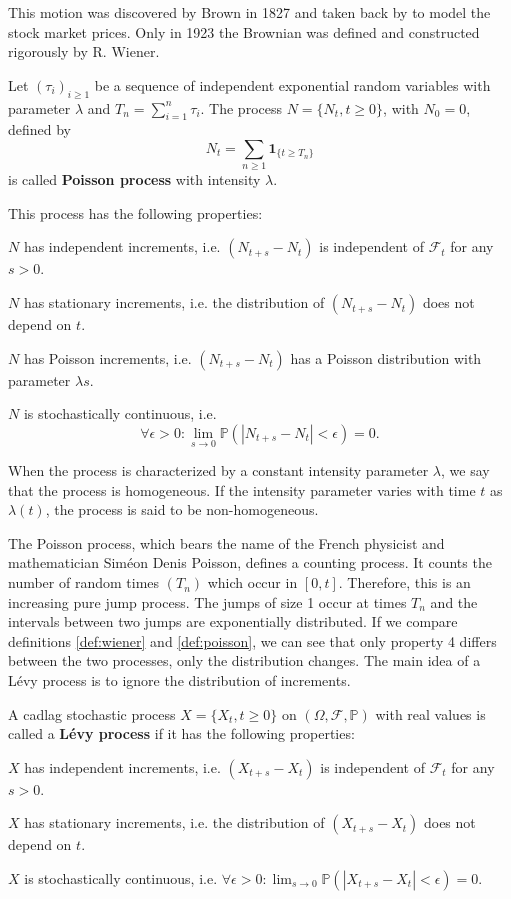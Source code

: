 This motion was discovered by Brown in 1827 and taken back by \citeauthor{Bac00} \citeyearpar{Bac00} to model the stock market prices. Only in 1923 the Brownian was defined and constructed rigorously by R. Wiener.

\begin{defn}\label{def:poisson}
Let $(\tau_i)_{i\geq 1}$ be a sequence of independent exponential random variables with parameter $\lambda$ and $T_n = \sum_{i=1}^n \tau_i$. The process $N = \{N_t,t\geq 0\}$, with $N_0=0$, defined by
$$N_t = \sum_{n\geq 1}\mathbf{1}_{\{t\geq T_n\}}$$
is called \textbf{Poisson process} with intensity $\lambda$.

This process has the following properties:
\begin{my_list_num}
\item $N$ has independent increments, i.e. $(N_{t+s}-N_t)$ is independent of $\mathcal{F}_t$ for any $s>0$. 
\item $N$ has stationary increments, i.e. the distribution of $(N_{t+s}-N_t)$ does not depend on $t$.
\item $N$ has Poisson increments, i.e. $(N_{t+s}-N_t)$ has a Poisson distribution with parameter $\lambda s$.
\item $N$ is stochastically continuous, i.e. $$\forall \epsilon>0: \lim_{s \to 0}\mathbb{P}(|N_{t+s}-N_t|<\epsilon)=0.$$
\end{my_list_num}
When the process is characterized by a constant intensity parameter $\lambda$, we say that the process is homogeneous. If the intensity parameter varies with time $t$ as $\lambda(t)$, the process is said to be non-homogeneous.
\end{defn}

The Poisson process, which bears the name of the French physicist and mathematician Sim\'eon Denis Poisson, defines a counting process. It counts the number of random times $(T_n)$ which occur in $[0,t]$. Therefore, this is an increasing pure jump process. The jumps of size 1 occur at times $T_n$ and the intervals between two jumps are exponentially distributed. If we compare definitions \ref{def:wiener} and \ref{def:poisson}, we can see that only property 4 differs between the two processes, only the distribution changes. The main idea of a L\'evy process is to ignore the distribution of increments.

\begin{defn}
A cadlag stochastic process $X =\{X_t,t\geq 0\}$ on $(\Omega,\mathcal{F},\mathbb{P})$ with real values is called a \textbf{L\'evy process} if it has the following properties:
\begin{my_list_num}
\item $X$ has independent increments, i.e. $(X_{t+s}-X_t)$ is independent of $\mathcal{F}_t$ for any $s>0$. 
\item $X$ has stationary increments, i.e. the distribution of $(X_{t+s}-X_t)$ does not depend on $t$. 
\item $X$ is stochastically continuous, i.e. $\forall \epsilon>0: \lim_{s \to 0}\mathbb{P}(|X_{t+s}-X_t|<\epsilon)=0.$
\end{my_list_num}
\end{defn}

